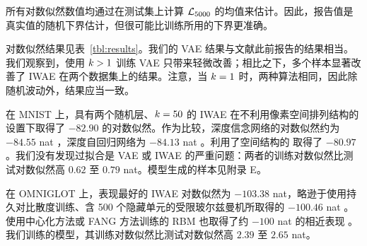 所有对数似然数值均通过在测试集上计算 $\mathcal{L}_{5000}$ 的均值来估计。因此，报告值是真实值的随机下界估计，但很可能比训练所用的下界更准确。

对数似然结果见表~\ref{tbl:results}。我们的 VAE 结果与文献此前报告的结果相当。我们观察到，使用 $k>1$ 训练 VAE 只带来轻微改善；相比之下，多个样本显著改善了 IWAE 在两个数据集上的结果。注意，当 $k=1$ 时，两种算法相同，因此除随机波动外，结果应当一致。

在 MNIST 上，具有两个随机层、$k=50$ 的 IWAE 在不利用像素空间排列结构的设置下取得了 $-82.90$ 的对数似然。作为比较，深度信念网络的对数似然约为 $-84.55$ nat \citep{dbn_chib}，深度自回归网络为 $-84.13$ nat \citep{DARN}。利用了空间结构的 \citet{draw} 取得了 $-80.97$。我们没有发现过拟合是 VAE 或 IWAE 的严重问题：两者的训练对数似然比测试对数似然高 $0.62$ 至 $0.79$ nat。模型生成的样本见附录 E。

在 OMNIGLOT 上，表现最好的 IWAE 对数似然为 $-103.38$ nat，略逊于使用持久对比散度训练、含 500 个隐藏单元的受限玻尔兹曼机所取得的 $-100.46$ nat \citep{raise}。使用中心化方法或 FANG 方法训练的 RBM 也取得了约 $-100$ nat 的相近表现 \citep{fang}。我们训练的模型，其训练对数似然比测试对数似然高 $2.39$ 至 $2.65$ nat。




